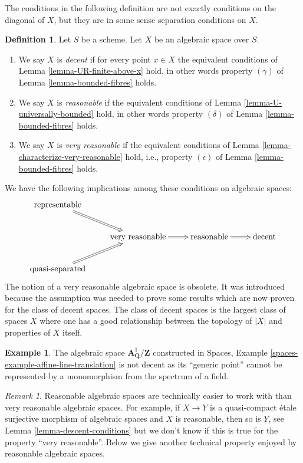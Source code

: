 \documentclass{stacks-project}
\theoremstyle{plain}
\theoremstyle{definition}
\newtheorem{definition}[subsection]{Definition}
\newtheorem{example}[subsection]{Example}
\theoremstyle{remark}
\newtheorem{remark}[subsection]{Remark}
\numberwithin{equation}{subsection}
\begin{document}
\medskip\noindent
The conditions in the following definition
are not exactly conditions on the diagonal of $X$, but they are in some
sense separation conditions on $X$.

\begin{definition}
\label{definition-very-reasonable}
Let $S$ be a scheme.
Let $X$ be an algebraic space over $S$.
\begin{enumerate}
\item We say $X$ is {\it decent} if for every point $x \in X$ the equivalent
conditions of
Lemma \ref{lemma-UR-finite-above-x}
hold, in other words property $(\gamma)$ of
Lemma \ref{lemma-bounded-fibres}
holds.
\item We say $X$ is {\it reasonable} if the equivalent conditions of
Lemma \ref{lemma-U-universally-bounded}
hold, in other words property $(\delta)$ of
Lemma \ref{lemma-bounded-fibres}
holds.
\item We say $X$ is {\it very reasonable} if the equivalent conditions of
Lemma \ref{lemma-characterize-very-reasonable}
hold, i.e., property $(\epsilon)$ of
Lemma \ref{lemma-bounded-fibres}
holds.
\end{enumerate}
\end{definition}

\noindent
We have the following implications among these conditions on algebraic spaces:
$$
\xymatrix{
\text{representable} \ar@{=>}[rd] & & & \\
 & \text{very reasonable} \ar@{=>}[r] &
\text{reasonable} \ar@{=>}[r] &
\text{decent} \\
\text{quasi-separated} \ar@{=>}[ru] & & &
}
$$
The notion of a very reasonable algebraic space is obsolete.
It was introduced because the assumption was needed to prove some results
which are now proven for the class of decent spaces.
The class of decent spaces is the largest class of spaces $X$ where one has
a good relationship between the topology of $|X|$ and
properties of $X$ itself.

\begin{example}
\label{example-not-decent}
The algebraic space $\mathbf{A}^1_{\mathbf{Q}}/\mathbf{Z}$ constructed in
Spaces, Example \ref{spaces-example-affine-line-translation}
is not decent as its ``generic point'' cannot be represented by a monomorphism
from the spectrum of a field.
\end{example}

\begin{remark}
\label{remark-reasonable}
Reasonable algebraic spaces are technically easier to work with than very
reasonable algebraic spaces. For example, if $X \to Y$ is a quasi-compact
\'etale surjective morphism of algebraic spaces and $X$ is reasonable, then
so is $Y$, see
Lemma \ref{lemma-descent-conditions}
but we don't know if this is true for the property ``very reasonable''.
Below we give another technical property enjoyed by reasonable
algebraic spaces.
\end{remark}
\end{document}
